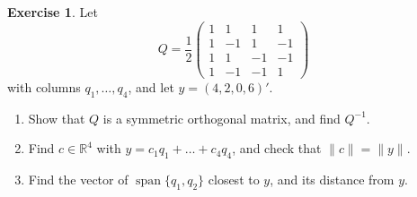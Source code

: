 \documentclass[12pt]{article}
\newcommand{\R}{\mathbb R}
\DeclareMathOperator{\Span}{span}
\theoremstyle{definition}
\newtheorem{exercise}{Exercise}
\begin{document}
\begin{exercise}\label{r6-ex-orthonormal-basis}
Let
\[
Q=\frac12\begin{pmatrix}1&1&1&1\\1&-1&1&-1\\1&1&-1&-1\\1&-1&-1&1\end{pmatrix}
\]
with columns \(q_1,\dots,q_4\), and let \(y=(4,2,0,6)'\).
\begin{enumerate}
\item Show that \(Q\) is a symmetric orthogonal matrix, and find \(Q^{-1}\).
\item Find \(c\in\R^4\) with \(y=c_1q_1+\dots+c_4q_4\), and check that \(\lVert c\rVert=\lVert y\rVert\).
\item Find the vector of \(\Span\{q_1,q_2\}\) closest to \(y\), and its distance from \(y\).
\end{enumerate}
\end{exercise}
\end{document}
